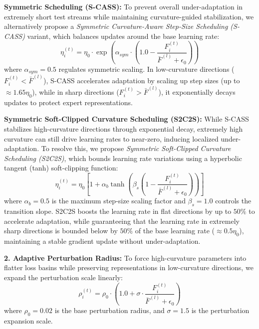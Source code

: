 \documentclass{article}
\theoremstyle{plain}
\theoremstyle{definition}
\theoremstyle{remark}
\begin{document}
\textbf{Symmetric Scheduling (S-CASS):} To prevent overall under-adaptation in extremely short test streams while maintaining curvature-guided stabilization, we alternatively propose a \textit{Symmetric Curvature-Aware Step-Size Scheduling (S-CASS)} variant, which balances updates around the base learning rate:
\begin{equation}
\eta_i^{(t)} = \eta_0 \cdot \exp\left(\alpha_{sym} \cdot \left(1.0 - \frac{F_i^{(t)}}{\bar{F}^{(l)} + \epsilon_0}\right)\right)
\end{equation}
where $\alpha_{sym} = 0.5$ regulates symmetric scaling. In low-curvature directions ($F_i^{(t)} < \bar{F}^{(l)}$), S-CASS accelerates adaptation by scaling up step sizes (up to $\approx 1.65\eta_0$), while in sharp directions ($F_i^{(t)} > \bar{F}^{(l)}$), it exponentially decays updates to protect expert representations.

\textbf{Symmetric Soft-Clipped Curvature Scheduling (S2C2S):} While S-CASS stabilizes high-curvature directions through exponential decay, extremely high curvature can still drive learning rates to near-zero, inducing localized under-adaptation. To resolve this, we propose \textit{Symmetric Soft-Clipped Curvature Scheduling (S2C2S)}, which bounds learning rate variations using a hyperbolic tangent (tanh) soft-clipping function:
\begin{equation}
\eta_i^{(t)} = \eta_0 \left[ 1 + \alpha_b \tanh\left(\beta_s \left(1 - \frac{F_i^{(t)}}{\bar{F}^{(l)} + \epsilon_0}\right)\right)\right]
\end{equation}
where $\alpha_b = 0.5$ is the maximum step-size scaling factor and $\beta_s = 1.0$ controls the transition slope. S2C2S boosts the learning rate in flat directions by up to $50\%$ to accelerate adaptation, while guaranteeing that the learning rate in extremely sharp directions is bounded below by $50\%$ of the base learning rate ($\approx 0.5\eta_0$), maintaining a stable gradient update without under-adaptation.

\textbf{2. Adaptive Perturbation Radius:}
To force high-curvature parameters into flatter loss basins while preserving representations in low-curvature directions, we expand the perturbation scale linearly:
\begin{equation}
\rho_i^{(t)} = \rho_0 \cdot \left(1.0 + \sigma \cdot \frac{F_i^{(t)}}{\bar{F}^{(l)} + \epsilon_0}\right)
\end{equation}
where $\rho_0 = 0.02$ is the base perturbation radius, and $\sigma = 1.5$ is the perturbation expansion scale.
\end{document}
